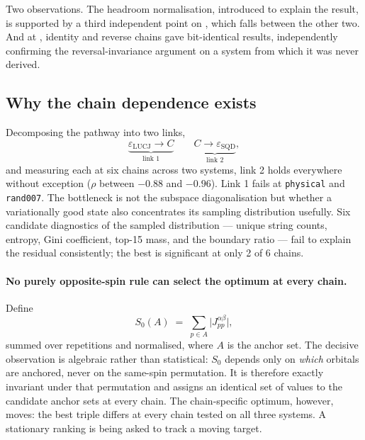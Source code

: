 \documentclass[11pt,a4paper]{article}
\begin{document}
Two observations. The headroom normalisation, introduced to explain the
 result, is supported by a third independent point on , which
falls between the other two. And at , identity and reverse chains
gave bit-identical results, independently confirming the reversal-invariance
argument on a system from which it was never derived.

\FloatBarrier
\subsection{Why the chain dependence exists}
\label{sec:transmission}

Decomposing the pathway into two links,
\begin{equation}
\underbrace{\varepsilon_{\text{LUCJ}} \rightarrow C}_{\text{link 1}}
\qquad
\underbrace{C \rightarrow \varepsilon_{\text{SQD}}}_{\text{link 2}},
\end{equation}
and measuring each at six chains across two systems, link 2 holds everywhere
without exception ($\rho$ between $-0.88$ and $-0.96$). Link 1 fails at
 \texttt{physical} and \texttt{rand007}. The bottleneck is not the
subspace diagonalisation but whether a variationally good state also
concentrates its sampling distribution usefully. Six candidate diagnostics of
the sampled distribution --- unique string counts, entropy, Gini coefficient,
top-15 mass, and the boundary ratio --- fail to explain the residual
consistently; the best is significant at only 2 of 6 chains.

\paragraph{No purely opposite-spin rule can select the optimum at every chain.}
Define
\begin{equation}
S_0(A) \;=\; \sum_{p\in A} \bigl\lvert J^{\alpha\beta}_{pp}\bigr\rvert,
\label{eq:s0}
\end{equation}
summed over repetitions and normalised, where $A$ is the anchor set. The
decisive observation is algebraic rather than statistical: $S_0$ depends only
on \emph{which} orbitals are anchored, never on the same-spin permutation. It
is therefore exactly invariant under that permutation and assigns an
identical set of values to the candidate anchor sets at every chain. The
chain-specific optimum, however, moves: the best triple differs at every
chain tested on all three systems. A stationary ranking is being asked to
track a moving target.
\end{document}
